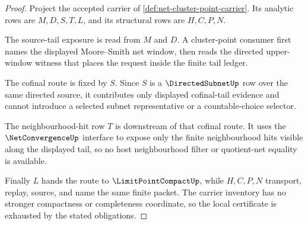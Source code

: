 \begin{proof}
Project the accepted carrier of \autoref{def:net-cluster-point-carrier}. Its analytic rows are $M,D,S,T,L$, and its structural rows are $H,C,P,N$.

The source-tail exposure is read from $M$ and $D$. A cluster-point consumer first names the displayed Moore--Smith net window, then reads the directed upper-window witness that places the request inside the finite tail ledger.

The cofinal route is fixed by $S$. Since $S$ is a $\DirectedSubnetUp$ row over the same directed source, it contributes only displayed cofinal-tail evidence and cannot introduce a selected subnet representative or a countable-choice selector.

The neighbourhood-hit row $T$ is downstream of that cofinal route. It uses the $\NetConvergenceUp$ interface to expose only the finite neighbourhood hits visible along the displayed tail, so no host neighbourhood filter or quotient-net equality is available.


Finally $L$ hands the route to $\LimitPointCompactUp$, while $H,C,P,N$ transport, replay, source, and name the same finite packet. The carrier inventory has no stronger compactness or completeness coordinate, so the local certificate is exhausted by the stated obligations.
\end{proof}


\begin{closurestatus}{\NetClusterPointUp}
  \theoryclosure{\seedClosure}
  \formalstatus{\unformalizedV}
\end{closurestatus}
